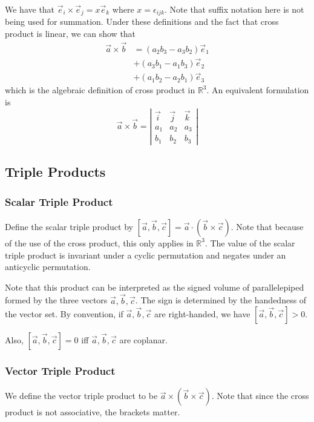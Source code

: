\documentclass[12pt]{article}
\begin{document}
We have that $\vec{e}_i \times \vec{e}_j = x\vec{e}_k$ where $x = \epsilon_{ijk}$.
Note that suffix notation here is not being used for summation.
Under these definitions and the fact that
cross product is linear, we can show that
\begin{align*}
    \vec{a} \times \vec{b} &= (a_{2}b_{3} - a_{3}b_{2})\vec{e}_1 \\
                           &+ (a_{3}b_{1} - a_{1}b_{3})\vec{e}_2 \\
                           &+ (a_{1}b_{2} - a_{2}b_{1})\vec{e}_3
\end{align*}
which is the algebraic definition of cross product in $\mathbb{R}^{3}$.
An equivalent formulation is
\[
\vec{a} \times \vec{b} = \left|\begin{matrix}
    \vec{i} & \vec{j} & \vec{k}\\
    a_{1} & a_{2} & a_{3}\\
    b_{1} & b_{2} & b_{3}
\end{matrix}\right|
\]
\subsection{Triple Products}

\subsubsection{Scalar Triple Product}

Define the scalar triple product by 
$[\vec{a},\vec{b},\vec{c}] = \vec{a} \cdot (\vec{b} \times \vec{c})$.
Note that because of the use of the cross product, 
this only applies in $\mathbb{R}^{3}$.
The value of the scalar triple product is invariant under
a cyclic permutation and negates under an anticyclic permutation.

Note that this product can be interpreted
as the signed volume of parallelepiped formed by the three vectors
$\vec{a},\vec{b},\vec{c}$.
The sign is determined by the handedness of the vector set.
By convention, if $\vec{a},\vec{b},\vec{c}$ are right-handed,
we have $[\vec{a},\vec{b},\vec{c}] > 0$.

Also, $[\vec{a},\vec{b},\vec{c}] = 0$ iff $\vec{a},\vec{b},\vec{c}$
are coplanar.

\subsubsection{Vector Triple Product}

We define the vector triple product to be $\vec{a}\times(\vec{b}\times\vec{c})$.
Note that since the cross product is not associative, the brackets matter.
\end{document}
